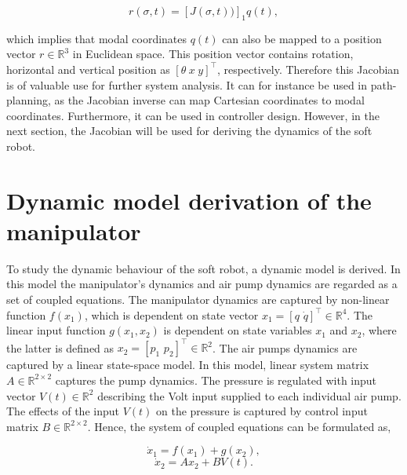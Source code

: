 \begin{equation}
    r(\sigma,t) = [J(\sigma,t))]_1q(t),
\end{equation}

which implies that modal coordinates $q(t)$ can also be mapped to a position vector $r\in \mathbb{R}^3$ in Euclidean space. This position vector contains rotation, horizontal and vertical position as $[\theta \hspace{3pt} x \hspace{3pt} y]^\top$, respectively. Therefore this Jacobian is of valuable use for further system analysis. It can for instance be used in path-planning, as the Jacobian inverse can map Cartesian coordinates to modal coordinates. Furthermore, it can be used in controller design. However, in the next section, the Jacobian will be used for deriving the dynamics of the soft robot. 


\section{Dynamic model derivation of the manipulator}

To study the dynamic behaviour of the soft robot, a dynamic model is derived. In this model the manipulator's dynamics and air pump dynamics are regarded as a set of coupled equations. The manipulator dynamics are captured by non-linear function $f(x_1)$, which is dependent on state vector $x_1 = [ q \hspace{4pt} \dot{q} ]^\top \in \mathbb{R}^4$. The linear input function $g(x_1,x_2)$ is dependent on state variables $x_1$ and $x_2$, where the latter is defined as $x_2 = [p_1 \hspace{4pt} p_2]^\top \in \mathbb{R}^2$. The air pumps dynamics are captured by a linear state-space model. In this model, linear system matrix $A \in \mathbb{R}^{2\times 2}$ captures the pump dynamics. The pressure is regulated with input vector $V(t) \in \mathbb{R}^2$ describing the Volt input supplied to each individual air pump. The effects of the input $V(t)$ on the pressure is captured by control input matrix $B \in \mathbb{R}^{2\times2}$. Hence, the system of coupled equations can be formulated as,




\begin{equation}
    \dot{x}_1  = f(x_1) + g(x_2), 
       \label{eq2:nonlineq1}
    \end{equation}
    \begin{equation}
    \dot{x}_2 = Ax_2 + BV(t). 
    \label{eq2:nonlineq2}
\end{equation}

